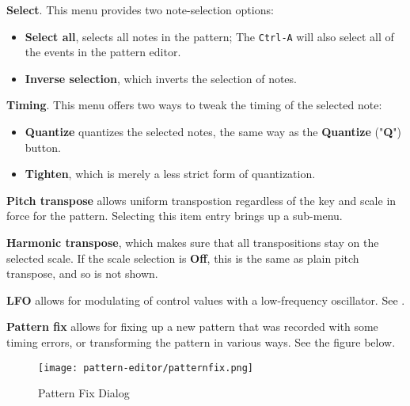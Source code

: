    \begin{enumber}
      \item \textbf{Select}.  This menu provides two note-selection options:
         \begin{itemize}
            \item \textbf{Select all}, selects all notes in the pattern;
               The  \texttt{Ctrl-A} will also select
               all of the events in the pattern editor.
            \item \textbf{Inverse selection}, which inverts the selection of
               notes.
         \end{itemize}
      \item \textbf{Timing}. This menu
            offers two ways to tweak the timing of the selected note:
         \begin{itemize}
            \item \textbf{Quantize}
               quantizes the selected notes, the same way as the
               \textbf{Quantize} ("\textbf{Q}") button.
            \item \textbf{Tighten},
               which is merely a less strict form of quantization.
         \end{itemize}
      \item \textbf{Pitch transpose} allows uniform transpostion
         regardless of the key and scale in force for the pattern.
         Selecting this item entry brings up a sub-menu.
      \item \textbf{Harmonic transpose}, which makes sure
         that all transpositions stay on the selected scale.
         If the scale selection is \textbf{Off}, this is the same as plain pitch
         transpose, and so is not shown.
      \item \textbf{LFO} allows for modulating of control values with a
         low-frequency oscillator.
         See .
      \item \textbf{Pattern fix} allows for fixing up a new pattern
         that was recorded with some timing errors, or transforming the
         pattern in various ways.
         See the figure below.
   \end{enumber}

\begin{figure}[H]
   \centering 
  \texttt{[image: pattern-editor/patternfix.png]}
   \caption{Pattern Fix Dialog}
   \label{fig:pattern_editor_pattern_fix}
\end{figure}

